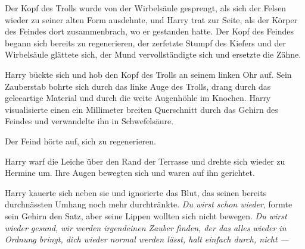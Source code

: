 

Der Kopf des Trolls wurde von der Wirbelsäule gesprengt, als sich der Felsen wieder zu seiner alten Form ausdehnte, und Harry trat zur Seite, als der Körper des Feindes dort zusammenbrach, wo er gestanden hatte. Der Kopf des Feindes begann sich bereits zu regenerieren, der zerfetzte Stumpf des Kiefers und der Wirbelsäule glättete sich, der Mund vervollständigte sich und ersetzte die Zähne.

Harry bückte sich und hob den Kopf des Trolls an seinem linken Ohr auf. Sein Zauberstab bohrte sich durch das linke Auge des Trolls, drang durch das geleeartige Material und durch die weite Augenhöhle im Knochen. Harry visualisierte einen ein Millimeter breiten Querschnitt durch das Gehirn des Feindes und verwandelte ihn in Schwefelsäure.

Der Feind hörte auf, sich zu regenerieren.


Harry warf die Leiche über den Rand der Terrasse und drehte sich wieder zu Hermine um. Ihre Augen bewegten sich und waren auf ihn gerichtet.

Harry kauerte sich neben sie und ignorierte das Blut, das seinen bereits durchnässten Umhang noch mehr durchtränkte.
\emph{Du wirst schon wieder}, formte sein Gehirn den Satz, aber seine Lippen wollten sich nicht bewegen. \emph{Du wirst wieder gesund, wir werden irgendeinen Zauber finden, der das alles wieder in Ordnung bringt, dich wieder normal werden lässt, halt einfach durch, nicht —}

